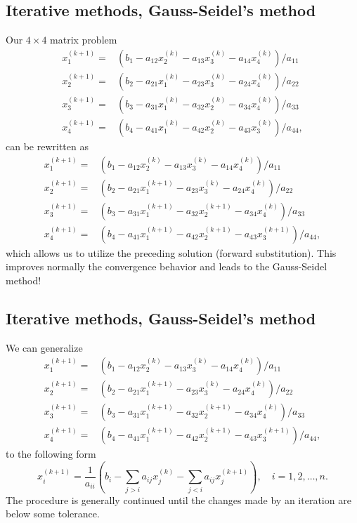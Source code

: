 \documentclass[%
twoside,                 %
final,                   %
10pt]{article}
\begin{document}
{{{{{{{%
\subsection{Iterative methods, Gauss-Seidel's method}
\begin{block}{}
Our $4\times 4$ matrix problem 
\begin{eqnarray}
 x_1^{(k+1)} =&(b_1-a_{12}x_2^{(k)} -a_{13}x_3^{(k)} - a_{14}x_4^{(k)})/a_{11} \nonumber \\
 x_2^{(k+1)} =&(b_2-a_{21}x_1^{(k)} - a_{23}x_3^{(k)} - a_{24}x_4^{(k)})/a_{22} \nonumber \\
 x_3^{(k+1)} =&(b_3- a_{31}x_1^{(k)} -a_{32}x_2^{(k)} -a_{34}x_4^{(k)})/a_{33} \nonumber \\
 x_4^{(k+1)}=&(b_4-a_{41}x_1^{(k)} -a_{42}x_2^{(k)} - a_{43}x_3^{(k)})/a_{44},  \nonumber
\end{eqnarray}
can be rewritten as 
\begin{eqnarray}
 x_1^{(k+1)} =&(b_1-a_{12}x_2^{(k)} -a_{13}x_3^{(k)} - a_{14}x_4^{(k)})/a_{11} \nonumber \\
 x_2^{(k+1)} =&(b_2-a_{21}x_1^{(k+1)} - a_{23}x_3^{(k)} - a_{24}x_4^{(k)})/a_{22} \nonumber \\
 x_3^{(k+1)} =&(b_3- a_{31}x_1^{(k+1)} -a_{32}x_2^{(k+1)} -a_{34}x_4^{(k)})/a_{33} \nonumber \\
 x_4^{(k+1)}=&(b_4-a_{41}x_1^{(k+1)} -a_{42}x_2^{(k+1)} - a_{43}x_3^{(k+1)})/a_{44},  \nonumber
\end{eqnarray}
which allows us to utilize the preceding solution (forward substitution). This improves normally the convergence
behavior and leads to the Gauss-Seidel method!
\end{block}

\subsection{Iterative methods, Gauss-Seidel's method}
\begin{block}{}
We can generalize 
\begin{eqnarray}
 x_1^{(k+1)} =&(b_1-a_{12}x_2^{(k)} -a_{13}x_3^{(k)} - a_{14}x_4^{(k)})/a_{11} \nonumber \\
 x_2^{(k+1)} =&(b_2-a_{21}x_1^{(k+1)} - a_{23}x_3^{(k)} - a_{24}x_4^{(k)})/a_{22} \nonumber \\
 x_3^{(k+1)} =&(b_3- a_{31}x_1^{(k+1)} -a_{32}x_2^{(k+1)} -a_{34}x_4^{(k)})/a_{33} \nonumber \\
 x_4^{(k+1)}=&(b_4-a_{41}x_1^{(k+1)} -a_{42}x_2^{(k+1)} - a_{43}x_3^{(k+1)})/a_{44},  \nonumber
\end{eqnarray}
to the following form
\[
 x^{(k+1)}_i = \frac{1}{a_{ii}} \left(b_i - \sum_{j > i}a_{ij}x^{(k)}_j - \sum_{j < i}a_{ij}x^{(k+1)}_j \right),\quad i=1,2,\ldots,n. 
\]
The procedure is generally continued until the changes made by an iteration are below some tolerance.


\end{block}}}}}}}}
\end{document}

